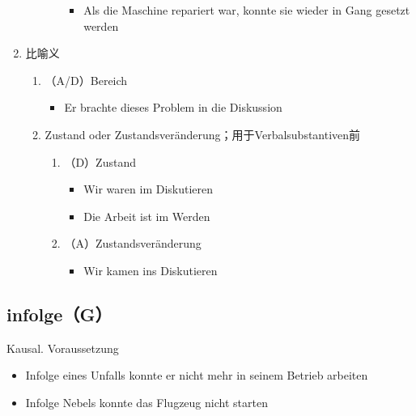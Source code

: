 \documentclass[UTF8]{report}
\begin{document}
\begin{enumerate}
\begin{enumerate}
\begin{enumerate}
            \begin{itemize}
                \item Als die Maschine repariert war, konnte sie wieder in Gang gesetzt werden
            \end{itemize}
        \end{enumerate}
    \end{enumerate}
    \item 比喻义
    \begin{enumerate}
        \item（A/D）Bereich
        \begin{itemize}
            \item Er brachte dieses Problem in die Diskussion
        \end{itemize}
        \item Zustand oder Zustandsveränderung；用于Verbalsubstantiven前
        \begin{enumerate}
            \item （D）Zustand
            \begin{itemize}
                \item Wir waren im Diskutieren
                \item Die Arbeit ist im Werden
            \end{itemize}
            \item （A）Zustandsveränderung
            \begin{itemize}
                \item Wir kamen ins Diskutieren
            \end{itemize}
        \end{enumerate}
    \end{enumerate}
\end{enumerate}

\subsection{infolge（G）}
Kausal. Voraussetzung
\begin{itemize}
    \item Infolge eines Unfalls konnte er nicht mehr in seinem Betrieb arbeiten
    \item Infolge Nebels konnte das Flugzeug nicht starten
\end{itemize}
\end{document}
